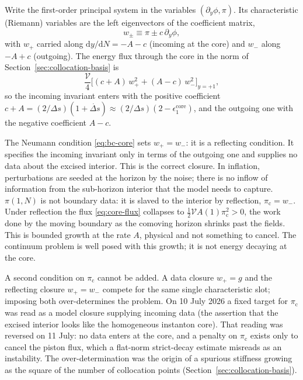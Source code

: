 \documentclass[a4paper,11pt]{article}
\renewcommand{\d}{\mathrm{d}}
\newcommand{\Ny}{N}                          %
\newcommand{\epsSR}{\epsilon_1}              %
\newcommand{\field}{\phi}                    %
\newcommand{\mom}{\pi}                       %
\newcommand{\yco}{y}                         %
\newcommand{\Deltas}{\Delta s}                %
\newcommand{\epscore}{\epsSR^{\mathrm{core}}} %
\newcommand{\advcoef}{A}                     %
\newcommand{\volel}{\mathcal{V}}             %
\newcommand{\wspeed}{c}                       %
\newcommand{\core}{\mathrm{c}}                %
\begin{document}
Write the first-order principal system in the variables
$(\partial_\yco\field,\mom)$. Its characteristic (Riemann) variables are
the left eigenvectors of the coefficient matrix,
\begin{equation}
    w_\pm \equiv \mom \pm \wspeed\,\partial_\yco\field ,
    \label{eq:riemann-variables}
\end{equation}
with $w_+$ carried along $\d\yco/\d\Ny=-\advcoef-\wspeed$ (incoming at
the core) and $w_-$ along $-\advcoef+\wspeed$ (outgoing). The energy flux
through the core in the norm of Section~\ref{sec:collocation-basis} is
\begin{equation}
    \frac{\volel}{4}\Big[(\wspeed+\advcoef)\,w_+^2 + (\advcoef-\wspeed)\,w_-^2\Big]_{\yco=+1} ,
    \label{eq:core-flux}
\end{equation}
so the incoming invariant enters with the positive coefficient
$\wspeed+\advcoef=(2/\Deltas)(1+\dot{\Deltas})\approx(2/\Deltas)(2-\epscore)$,
and the outgoing one with the negative coefficient $\advcoef-\wspeed$.

The Neumann condition \eqref{eq:bc-core} sets $w_+=w_-$: it is a
reflecting condition. It specifies the incoming invariant only in terms of
the outgoing one and supplies no data about the excised interior. This is
the correct closure. In inflation, perturbations are seeded at the horizon
by the noise; there is no inflow of information from the sub-horizon
interior that the model needs to capture. $\mom(1,\Ny)$ is not boundary
data: it is slaved to the interior by reflection, $\mom_\core=w_-$. Under
reflection the flux \eqref{eq:core-flux} collapses to
$\tfrac12\volel\advcoef(1)\mom_\core^2>0$, the work done by the moving
boundary as the comoving horizon shrinks past the fields. This is bounded
growth at the rate $\advcoef$, physical and not something to cancel. The
continuum problem is well posed with this growth; it is not energy
decaying at the core.

A second condition on $\mom_\core$ cannot be added. A data closure
$w_+=g$ and the reflecting closure $w_+=w_-$ compete for the same single
characteristic slot; imposing both over-determines the problem. On
10 July 2026 a fixed target for $\mom_\core$ was read as a model closure
supplying incoming data (the assertion that the excised interior looks
like the homogeneous instanton core). That reading was reversed on
11 July: no data enters at the core, and a penalty on $\mom_\core$ exists
only to cancel the piston flux, which a flat-norm strict-decay estimate
misreads as an instability. The over-determination was the origin of a
spurious stiffness growing as the square of the number of collocation
points (Section~\ref{sec:collocation-basis}).
\end{document}
